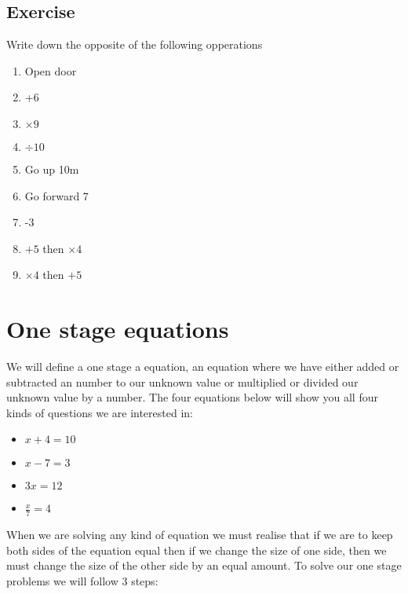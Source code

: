 \subsection{Exercise}
Write down the opposite of the following opperations
\begin{multicols}{3}
\begin{enumerate}
	\item Open door
	\item +6
	\item $\times 9$
	\item $\div 10$
	\item Go up 10m
	\item Go forward 7
	\item -3
	\item $+5$ then $\times 4$
	\item $\times 4$ then $+5$
\end{enumerate}
\end{multicols}
\section{One stage equations}
We will define a one stage a equation, an equation where we have either added or subtracted an number to our unknown value or multiplied or divided our unknown value by a number.  The four equations below will show you all four kinds of questions we are interested in:
\begin{multicols}{4}
\begin{itemize}
	\item $x+4=10$
	\item $x-7=3$
	\item $3x=12$
	\item $\displaystyle\frac{x}{7}=4$
\end{itemize}
\end{multicols}

When we are solving any kind of equation we must realise that if we are to keep both sides of the equation equal then if we change the size of one side, then we must change the size of the other side by an equal amount.  To solve our one stage problems we will follow 3 steps:

